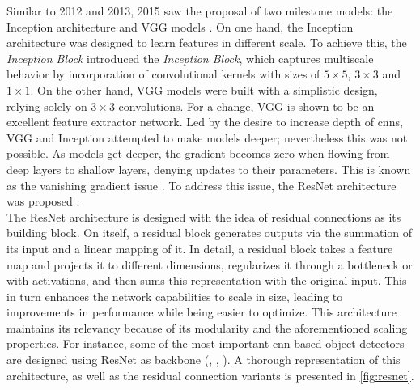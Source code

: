 \noindent Similar to 2012 and 2013, 2015 saw the proposal of two milestone models: the Inception 
architecture \autocite{szegedy2015going} and VGG models \autocite{simonyan2015deep}. On one hand, 
the Inception architecture was designed to learn features in different scale. To achieve this, the 
\emph{Inception Block} introduced the \emph{Inception Block}, which captures multiscale behavior 
by incorporation  of convolutional kernels with sizes of $5\times5$, $3\times 3$ 
and $1\times1$. On the other hand, VGG models were built with a simplistic design, relying solely 
on $3\times 3$ convolutions. For a change, VGG is shown to be an excellent feature extractor 
network. Led by the desire to increase depth of \glspl{cnn}, VGG and Inception attempted to make 
models deeper; nevertheless this was not possible. As models get deeper, the gradient becomes zero 
when flowing from deep layers to shallow layers, denying updates to their 
parameters. This is known as the vanishing gradient issue \autocite{pascanu2013difficulty}. To address this issue, the ResNet architecture was 
proposed \autocite{he2016deep}.\\


%
\noindent The ResNet architecture is designed with the idea of residual connections as its 
building block. On itself, a residual block generates outputs via the summation of its input and a 
linear mapping of it. In detail, a residual block takes a feature map and projects it to 
different dimensions, regularizes it through a bottleneck or with activations, and then sums this 
representation with the original input. This in turn enhances the network capabilities to scale in 
size, leading to improvements in performance while being easier to optimize. This architecture 
maintains its relevancy because of its modularity and the aforementioned scaling properties. For 
instance, some of the most important \gls{cnn} based object detectors are designed using ResNet as 
backbone (\cite{ren2015faster}, \cite{lin2017focal}, \cite{he2017mask}). A thorough representation 
of this architecture, as well as the residual connection variants is presented in 
\autoref{fig:resnet}.\\

